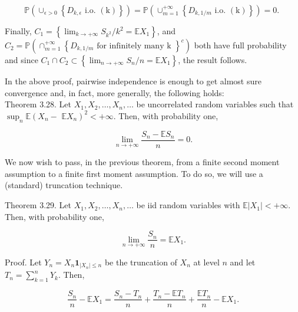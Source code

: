\documentclass{amsbook}
\theoremstyle{plain}%
\theoremstyle{definition}
\theoremstyle{remark}
\begin{document}
    $$
    \mathbb{P}\left(\cup_{\epsilon>0}\left\{D_{k, \epsilon} \text { i.o. }(\mathrm{k})\right\}\right)=\mathbb{P}\left(\cup_{m=1}^{+\infty}\left\{D_{k, 1 / m} \text { i.o. }(\mathrm{k})\right\}\right)=0 \text {. }
    $$

    Finally, $C_{1}=\left\{\lim _{k \rightarrow+\infty} S_{k^{2}} / k^{2}=\mathbb{E} X_{1}\right\}$, and $C_{2}=\mathbb{P}\left(\cap_{m=1}^{+\infty}\left\{D_{k, 1 / m} \text { for infinitely many k }\right\}^{c}\right)$ both have full probability and since $C_{1} \cap C_{2} \subset\left\{\lim _{n \rightarrow+\infty} S_{n} / n=\mathbb{E} X_{1}\right\}$, the result follows.

    In the above proof, pairwise independence is enough to get almost sure convergence and, in fact, more generally, the following holds:\\

    Theorem 3.28. Let $X_{1}, X_{2}, \ldots, X_{n}, \ldots$ be uncorrelated random variables such that $\sup _{n} \mathbb{E}\left(X_{n}-\right.$ $\left.\mathbb{E} X_{n}\right)^{2}<+\infty$. Then, with probability one,

    $$
    \lim _{n \rightarrow+\infty} \frac{S_{n}-\mathbb{E} S_{n}}{n}=0 .
    $$

    We now wish to pass, in the previous theorem, from a finite second moment assumption to a finite first moment assumption. To do so, we will use a (standard) truncation technique.

    Theorem 3.29. Let $X_{1}, X_{2}, \ldots, X_{n}, \ldots$ be iid random variables with $\mathbb{E}\left|X_{1}\right|<+\infty$. Then, with probability one,

    $$
    \lim _{n \rightarrow+\infty} \frac{S_{n}}{n}=\mathbb{E} X_{1} .
    $$

    Proof. Let $Y_{n}=X_{n} \mathbf{1}_{\left|X_{n}\right| \leq n}$ be the truncation of $X_{n}$ at level $n$ and let $T_{n}=\sum_{k=1}^{n} Y_{k}$. Then,

    $$
    \frac{S_{n}}{n}-\mathbb{E} X_{1}=\frac{S_{n}-T_{n}}{n}+\frac{T_{n}-\mathbb{E} T_{n}}{n}+\frac{\mathbb{E} T_{n}}{n}-\mathbb{E} X_{1} .
    $$
\end{document}
